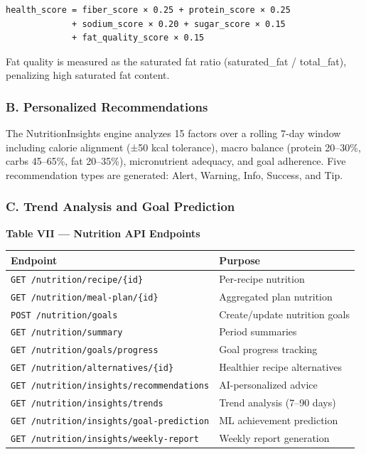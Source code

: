 \documentclass[10pt,conference,compsoc]{IEEEtran}
\begin{document}
\begin{lstlisting}
health_score = fiber_score × 0.25 + protein_score × 0.25
             + sodium_score × 0.20 + sugar_score × 0.15
             + fat_quality_score × 0.15
\end{lstlisting}

Fat quality is measured as the saturated fat ratio (saturated\_fat /
total\_fat), penalizing high saturated fat content.

\subsubsection{B. Personalized
Recommendations}\label{b.-personalized-recommendations}

The NutritionInsights engine analyzes 15 factors over a rolling 7-day
window including calorie alignment (±50 kcal tolerance), macro balance
(protein 20--30\%, carbs 45--65\%, fat 20--35\%), micronutrient
adequacy, and goal adherence. Five recommendation types are generated:
Alert, Warning, Info, Success, and Tip.

\subsubsection{C. Trend Analysis and Goal
Prediction}\label{c.-trend-analysis-and-goal-prediction}

\textbf{Table VII --- Nutrition API Endpoints}

\begin{longtable}[]{@{}
  >{\raggedright\arraybackslash}p{}
  >{\raggedright\arraybackslash}p{}@{}}
\toprule\noalign{}
\begin{minipage}[b]{\linewidth}\raggedright
Endpoint
\end{minipage} & \begin{minipage}[b]{\linewidth}\raggedright
Purpose
\end{minipage} \\
\midrule\noalign{}
\endhead
\bottomrule\noalign{}
\endlastfoot
\texttt{GET\ /nutrition/recipe/\{id\}} & Per-recipe nutrition \\
\texttt{GET\ /nutrition/meal-plan/\{id\}} & Aggregated plan nutrition \\
\texttt{POST\ /nutrition/goals} & Create/update nutrition goals \\
\texttt{GET\ /nutrition/summary} & Period summaries \\
\texttt{GET\ /nutrition/goals/progress} & Goal progress tracking \\
\texttt{GET\ /nutrition/alternatives/\{id\}} & Healthier recipe
alternatives \\
\texttt{GET\ /nutrition/insights/recommendations} & AI-personalized
advice \\
\texttt{GET\ /nutrition/insights/trends} & Trend analysis (7--90
days) \\
\texttt{GET\ /nutrition/insights/goal-prediction} & ML achievement
prediction \\
\texttt{GET\ /nutrition/insights/weekly-report} & Weekly report
generation \\
\end{longtable}
\end{document}
